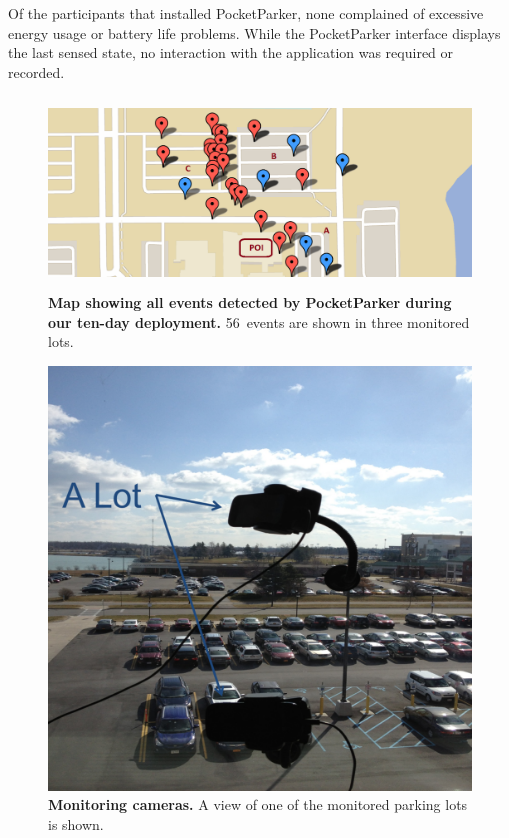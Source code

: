 Of the participants that installed PocketParker, none complained of excessive
energy usage or battery life problems. While the PocketParker interface
displays the last sensed state, no interaction with the application was
required or recorded.

\begin{figure}
\centering
\includegraphics[width=\textwidth,height=2in]{./figures/detectedEventsOnMap.pdf}

\caption{\textbf{Map showing all events detected by PocketParker during our
ten-day deployment.} 56~events are shown in three monitored lots.}

\label{fig-events}
\end{figure}

\begin{figure}
\centering
\includegraphics[width=\columnwidth]{./figures/Camera_setting.pdf}

\caption{\textbf{Monitoring cameras.} A view of one of the monitored parking
lots is shown.}

\label{fig-camera}
\end{figure}

